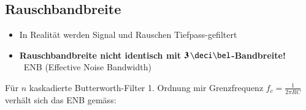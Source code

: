 





\subsection{Rauschbandbreite}

\begin{itemize}
    \item In Realität werden Signal und Rauschen Tiefpass-gefiltert
    \item \textbf{Rauschbandbreite nicht identisch mit $\bm{3 \, \deci \bel}$-Bandbreite!} \\
        \textrightarrow\ ENB (Effective Noise Bandwidth)
\end{itemize}

\vspace{0.2cm}
Für $n$ kaskadierte Butterworth-Filter 1. Ordnung mir Grenzfrequenz $f_c = \frac{1}{2 \pi R C}$ verhält sich das ENB gemäss:

